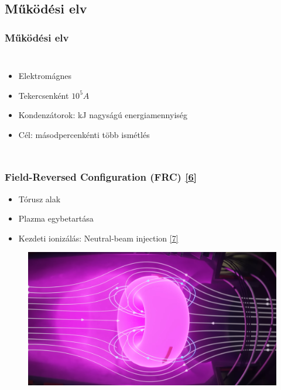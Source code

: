 \documentclass{beamer}
\begin{document}
\subsection{Működési elv}
\begin{frame}
    \frametitle{Működési elv}
    \begin{columns}
        \begin{itemize}
            \footnotesize
            \item Elektromágnes
            \item Tekercsenként $10^5A$
            \item Kondenzátorok: kJ nagyságú energiamennyiség 
            \item Cél: másodpercenkénti több ismétlés
        \end{itemize}
    \end{columns}
\end{frame}
\begin{frame}
    \frametitle{Field-Reversed Configuration (FRC) \hyperlink{6}{\small[6]}}
    \begin{itemize}
        \item Tórusz alak
        \item Plazma egybetartása
        \item Kezdeti ionizálás: Neutral-beam injection \hyperlink{7}{\small[7]}
    \end{itemize}
    \begin{figure}
        \includegraphics[scale=0.15]{field_reverse_config.png}
    \end{figure}
\end{frame}
\end{document}
